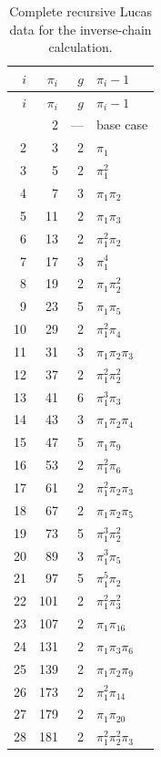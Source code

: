 \documentclass[11pt,a4paper]{article}
\theoremstyle{definition}
\theoremstyle{remark}
\numberwithin{equation}{section}
\begin{document}
{\footnotesize
\setlength{\tabcolsep}{4pt}
\renewcommand{\arraystretch}{1.12}
\begin{longtable}{r r r l}
\caption{Complete recursive Lucas data for the inverse-chain calculation.}
\label{A:tab:lucas-all}\\
\toprule
$i$ & $\pi_i$ & $g$ & $\pi_i-1$\\\midrule
\endfirsthead
\toprule
$i$ & $\pi_i$ & $g$ & $\pi_i-1$\\\midrule
\endhead
\bottomrule
\endfoot
1 & 2 & --- & base case \\
2 & 3 & 2 & $\pi_{1}$ \\
3 & 5 & 2 & $\pi_{1}^{2}$ \\
4 & 7 & 3 & $\pi_{1}\pi_{2}$ \\
5 & 11 & 2 & $\pi_{1}\pi_{3}$ \\
6 & 13 & 2 & $\pi_{1}^{2}\pi_{2}$ \\
7 & 17 & 3 & $\pi_{1}^{4}$ \\
8 & 19 & 2 & $\pi_{1}\pi_{2}^{2}$ \\
9 & 23 & 5 & $\pi_{1}\pi_{5}$ \\
10 & 29 & 2 & $\pi_{1}^{2}\pi_{4}$ \\
11 & 31 & 3 & $\pi_{1}\pi_{2}\pi_{3}$ \\
12 & 37 & 2 & $\pi_{1}^{2}\pi_{2}^{2}$ \\
13 & 41 & 6 & $\pi_{1}^{3}\pi_{3}$ \\
14 & 43 & 3 & $\pi_{1}\pi_{2}\pi_{4}$ \\
15 & 47 & 5 & $\pi_{1}\pi_{9}$ \\
16 & 53 & 2 & $\pi_{1}^{2}\pi_{6}$ \\
17 & 61 & 2 & $\pi_{1}^{2}\pi_{2}\pi_{3}$ \\
18 & 67 & 2 & $\pi_{1}\pi_{2}\pi_{5}$ \\
19 & 73 & 5 & $\pi_{1}^{3}\pi_{2}^{2}$ \\
20 & 89 & 3 & $\pi_{1}^{3}\pi_{5}$ \\
21 & 97 & 5 & $\pi_{1}^{5}\pi_{2}$ \\
22 & 101 & 2 & $\pi_{1}^{2}\pi_{3}^{2}$ \\
23 & 107 & 2 & $\pi_{1}\pi_{16}$ \\
24 & 131 & 2 & $\pi_{1}\pi_{3}\pi_{6}$ \\
25 & 139 & 2 & $\pi_{1}\pi_{2}\pi_{9}$ \\
26 & 173 & 2 & $\pi_{1}^{2}\pi_{14}$ \\
27 & 179 & 2 & $\pi_{1}\pi_{20}$ \\
28 & 181 & 2 & $\pi_{1}^{2}\pi_{2}^{2}\pi_{3}$ \\

\end{longtable}}
\end{document}
